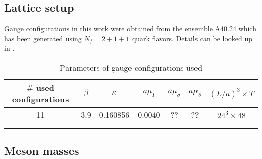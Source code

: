 

\subsection{Lattice setup}
    Gauge configurations in this work were obtained from the ensemble A40.24 which has been generated using $N_f = 2 + 1 + 1$ quark flavors. Details can be looked up in \cite{guage_configurations}.
    
    \begin{table}[h]
        \centering
        \begin{tabular}{lllllll}
        \hline
        \multicolumn{1}{|c|}{$\#$ used configurations} & \multicolumn{1}{c|}{$\beta$} & \multicolumn{1}{c|}{$\kappa$} & \multicolumn{1}{c|}{$a\mu_I$} & \multicolumn{1}{c|}{$a\mu_\sigma$} & \multicolumn{1}{c|}{$a\mu_\delta$} & \multicolumn{1}{c|}{$(L/a)^3 \times T$} \\ \hline
        \multicolumn{1}{|c|}{11} & \multicolumn{1}{c|}{3.9} & \multicolumn{1}{c|}{0.160856} & \multicolumn{1}{c|}{0.0040} & \multicolumn{1}{c|}{??} & \multicolumn{1}{c|}{??} & \multicolumn{1}{c|}{$24^3 \times 48$} \\ \hline
                               &                       &                       &                       &                       &                       &                       \\
                               &                       &                       &                       &                       &                       &                      
        \end{tabular}
        \caption{Parameters of gauge configurations used}
        \label{table_gauge_params}
    \end{table}
    
\subsection{Meson masses}
